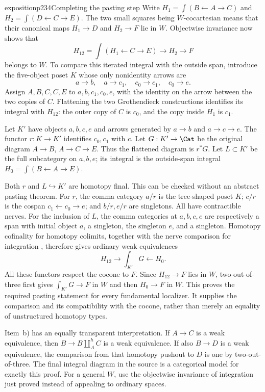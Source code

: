 \begin{dcomment}{exposition}{p234}{Completing the pasting step}
Write $H_1=\int(B\leftarrow A\to C)$ and $H_2=\int(D\leftarrow C\to E)$. The two small squares being $W$-cocartesian means that their canonical maps $H_1\to D$ and $H_2\to F$ lie in $W$. Objectwise invariance now shows that
\[
 H_{12}=\int(H_1\leftarrow C\to E)\longrightarrow H_2\longrightarrow F
\]
belongs to $W$. To compare this iterated integral with the outside span, introduce the five-object poset $K$ whose only nonidentity arrows are
\[
 a\to b,\quad a\to c_1,\quad c_0\to c_1,\quad c_0\to e.
\]
Assign $A,B,C,C,E$ to $a,b,c_1,c_0,e$, with the identity on the arrow between the two copies of $C$. Flattening the two Grothendieck constructions identifies its integral with $H_{12}$: the outer copy of $C$ is $c_0$, and the copy inside $H_1$ is $c_1$.

Let $K'$ have objects $a,b,c,e$ and arrows generated by $a\to b$ and $a\to c\to e$. The functor $r:K\to K'$ identifies $c_0,c_1$ with $c$. Let $G:K'\to\Cat$ be the original diagram $A\to B$, $A\to C\to E$. Thus the flattened diagram is $r^*G$. Let $L\subset K'$ be the full subcategory on $a,b,e$; its integral is the outside-span integral $H_0=\int(B\leftarrow A\to E)$.

Both $r$ and $L\hookrightarrow K'$ are homotopy final. This can be checked without an abstract pasting theorem. For $r$, the comma category $a/r$ is the tree-shaped poset $K$; $c/r$ is the cospan $c_1\leftarrow c_0\to e$; and $b/r,e/r$ are singletons. All have contractible nerves. For the inclusion of $L$, the comma categories at $a,b,c,e$ are respectively a span with initial object $a$, a singleton, the singleton $e$, and a singleton. Homotopy cofinality for homotopy colimits, together with the nerve comparison for integration \citep[Theorem 1.2]{Thomason1979}, therefore gives ordinary weak equivalences
\[
 H_{12}\longrightarrow \int_{K'}G\longleftarrow H_0.
\]
All these functors respect the cocone to $F$. Since $H_{12}\to F$ lies in $W$, two-out-of-three first gives $\int_{K'}G\to F$ in $W$ and then $H_0\to F$ in $W$. This proves the required pasting statement for every fundamental localizer. It supplies the comparison and its compatibility with the cocone, rather than merely an equality of unstructured homotopy types.

Item~b) has an equally transparent interpretation. If $A\to C$ is a weak equivalence, then $B\to B\amalg_A^hC$ is a weak equivalence. If also $B\to D$ is a weak equivalence, the comparison from that homotopy pushout to $D$ is one by two-out-of-three. The final integral diagram in the source is a categorical model for exactly this proof. For a general $W$, use the objectwise invariance of integration just proved instead of appealing to ordinary spaces.


\end{dcomment}
